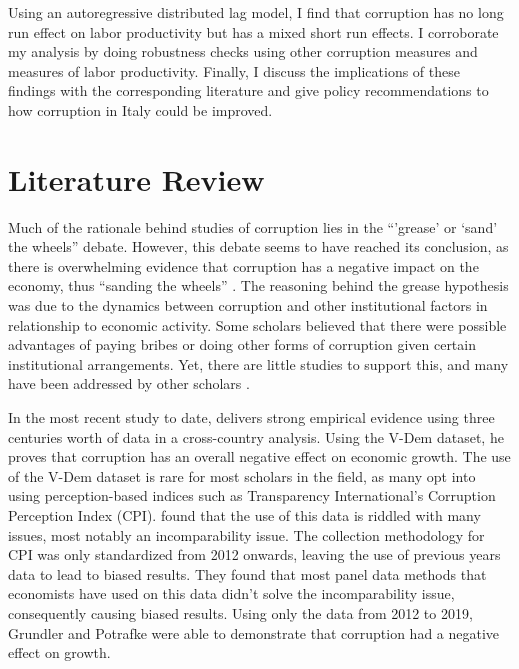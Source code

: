 \documentclass[12pt]{article} %
\begin{document}
Using an autoregressive distributed lag model, I find that corruption has no long run effect on labor productivity but has a mixed short run effects. I corroborate my analysis by doing robustness checks using other corruption measures and measures of labor productivity. Finally, I discuss the implications of these findings with the corresponding literature and give policy recommendations to how corruption in Italy could be improved.



	
\section*{Literature Review}

Much of the rationale behind studies of corruption lies in the “’grease’ or ‘sand’ the wheels” debate. However, this debate seems to have reached its conclusion, as there is overwhelming evidence that corruption has a negative impact on the economy, thus “sanding the wheels” \citep{aidt_corruption_2009, grundler_corruption_2019-1, uberti_corruption_2022}. The reasoning behind the grease hypothesis was due to the dynamics between corruption and other institutional factors in relationship to economic activity. Some scholars believed that there were possible advantages of paying bribes or doing other forms of corruption given certain institutional arrangements. Yet, there are little studies to support this, and many have been addressed by other scholars \citep{aidt_corruption_2009}. 

In the most recent study to date, \citet{uberti_corruption_2022} delivers strong empirical evidence using three centuries worth of data in a cross-country analysis. Using the V-Dem dataset, he proves that corruption has an overall negative effect on economic growth. The use of the V-Dem dataset is rare for most scholars in the field, as many opt into using perception-based indices such as Transparency International’s Corruption Perception Index (CPI). \citep{grundler_corruption_2019-1} found that the use of this data is riddled with many issues, most notably an incomparability issue. The collection methodology for CPI was only standardized from 2012 onwards, leaving the use of previous years data to lead to biased results. They found that most panel data methods that economists have used on this data didn’t solve the incomparability issue, consequently causing biased results. Using only the data from 2012 to 2019, Grundler and Potrafke were able to demonstrate that corruption had a negative effect on growth.
\end{document}
